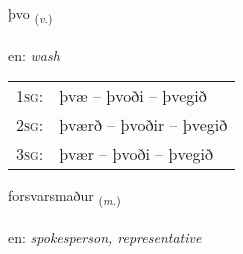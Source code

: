 \documentclass[frontgrid, backgrid]{flacards}\usepackage[]{graphicx}\usepackage[]{xcolor}
\begin{document}
\renewcommand{\flhead}{\vskip5pt \fboxsep=0pt {\small\bfseries\footnotesize Sagnorð | Verb}}
\renewcommand{\fcfoot}{\vskip5pt \fboxsep=0pt \hspace{2pt}{\small\bfseries\footnotesize 3K}}

\renewcommand{\blhead}{\vskip5pt {\small\bfseries\footnotesize Sagnorð | Verb }}
\renewcommand{\bcfoot}{\vskip5pt \hspace{2pt}{\small\bfseries\footnotesize 3K}}


{þvo \small{\textsubscript{(\textit{v.})}} \\[1ex] %
\textphonetic{[θvɔː]} \\
en: \emph{wash} \\  [2ex]
\renewcommand*{\arraystretch}{0.8}
\begin{tabular}{p{1cm}l}
\textsc{1sg}: & þvæ -- þvoði -- þvegið \\ 
\textsc{2sg}: & þværð -- þvoðir -- þvegið \\ 
\textsc{3sg}: & þvær -- þvoði -- þvegið \\ 
\end{tabular}
}

\renewcommand{\flhead}{\vskip5pt \fboxsep=0pt {\small\bfseries\footnotesize Nafnorð | Noun}}
\renewcommand{\fcfoot}{\vskip5pt \fboxsep=0pt \hspace{2pt}{\small\bfseries\footnotesize 3K}}

\renewcommand{\blhead}{\vskip5pt {\small\bfseries\footnotesize Nafnorð | Noun }}
\renewcommand{\bcfoot}{\vskip5pt \hspace{2pt}{\small\bfseries\footnotesize 3K}}


{forsvarsmaður \small{\textsubscript{(\textit{m.})}} \\[1ex] %
 \\
en: \emph{spokesperson, representative} \\  [2ex]
\renewcommand*{\arraystretch}{0.8}
}
\end{document}

